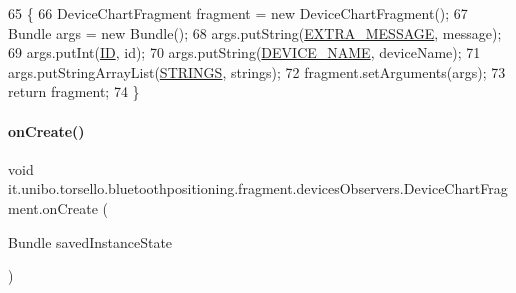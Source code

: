 \begin{DoxyCode}
65                                                                              \{
66         DeviceChartFragment fragment = \textcolor{keyword}{new} DeviceChartFragment();
67         Bundle args = \textcolor{keyword}{new} Bundle();
68         args.putString(\hyperlink{classit_1_1unibo_1_1torsello_1_1bluetoothpositioning_1_1fragment_1_1devicesObservers_1_1DeviceChartFragment_a07b2f252088c2cf0af46ea39ae83bc09_a07b2f252088c2cf0af46ea39ae83bc09}{EXTRA\_MESSAGE}, message);
69         args.putInt(\hyperlink{classit_1_1unibo_1_1torsello_1_1bluetoothpositioning_1_1fragment_1_1devicesObservers_1_1DeviceChartFragment_a00d660ba184cd81eec2512b14ca610c1_a00d660ba184cd81eec2512b14ca610c1}{ID}, \textcolor{keywordtype}{id});
70         args.putString(\hyperlink{classit_1_1unibo_1_1torsello_1_1bluetoothpositioning_1_1fragment_1_1devicesObservers_1_1DeviceChartFragment_a5f778eb494a70b25d52ea96e85342011_a5f778eb494a70b25d52ea96e85342011}{DEVICE\_NAME}, deviceName);
71         args.putStringArrayList(\hyperlink{classit_1_1unibo_1_1torsello_1_1bluetoothpositioning_1_1fragment_1_1devicesObservers_1_1DeviceChartFragment_a343835bbfb305e22881397c1b9249b00_a343835bbfb305e22881397c1b9249b00}{STRINGS}, strings);
72         fragment.setArguments(args);
73         \textcolor{keywordflow}{return} fragment;
74     \}
\end{DoxyCode}
\hypertarget{classit_1_1unibo_1_1torsello_1_1bluetoothpositioning_1_1fragment_1_1devicesObservers_1_1DeviceChartFragment_a2941a5d389e0ab2c21cb96a61ba72dca_a2941a5d389e0ab2c21cb96a61ba72dca}{}\label{classit_1_1unibo_1_1torsello_1_1bluetoothpositioning_1_1fragment_1_1devicesObservers_1_1DeviceChartFragment_a2941a5d389e0ab2c21cb96a61ba72dca_a2941a5d389e0ab2c21cb96a61ba72dca} 
\paragraph{\texorpdfstring{on\+Create()}{onCreate()}}
{\footnotesize\ttfamily void it.\+unibo.\+torsello.\+bluetoothpositioning.\+fragment.\+devices\+Observers.\+Device\+Chart\+Fragment.\+on\+Create (\begin{DoxyParamCaption}\item[{Bundle}]{saved\+Instance\+State }\end{DoxyParamCaption})}


